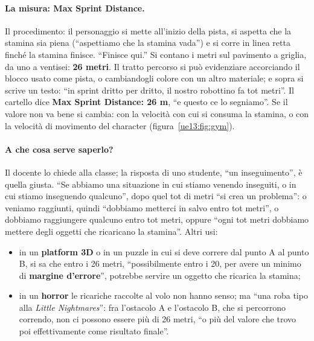 \paragraph{La misura: Max Sprint Distance.} Il procedimento: il personaggio si mette
all'inizio della pista, si aspetta che la stamina sia piena (``aspettiamo che la stamina
vada'') e si corre in linea retta finché la stamina finisce. ``Finisce qui.'' Si contano i
metri sul pavimento a griglia, da uno a ventisei: \textbf{26 metri}. Il tratto percorso
si può evidenziare accorciando il blocco usato come pista, o cambiandogli colore con un
altro materiale; e sopra si scrive un testo: ``in sprint dritto per dritto, il nostro
robottino fa tot metri''. Il cartello dice \textbf{Max Sprint Distance: 26 m}, ``e questo
ce lo segniamo''. Se il valore non va bene si cambia: con la velocità con cui si consuma
la stamina, o con la velocità di movimento del character (figura~\ref{ue13:fig:gym}).

\paragraph{A che cosa serve saperlo?} Il docente lo chiede alla classe; la risposta di uno
studente, ``un inseguimento'', è quella giusta. ``Se abbiamo una situazione in cui stiamo
venendo inseguiti, o in cui stiamo inseguendo qualcuno'', dopo quel tot di metri ``si crea
un problema'': o veniamo raggiunti, quindi ``dobbiamo metterci in salvo entro tot metri'',
o dobbiamo raggiungere qualcuno entro tot metri, oppure ``ogni tot metri dobbiamo mettere
degli oggetti che ricaricano la stamina''. Altri usi:
\begin{itemize}
  \item in un \textbf{platform 3D} o in un puzzle in cui si deve correre dal punto A al
        punto B, si sa che entro i 26 metri, ``possibilmente entro i 20, per avere un
        minimo di \textbf{margine d'errore}'', potrebbe servire un oggetto che ricarica
        la stamina;
  \item in un \textbf{horror} le ricariche raccolte al volo non hanno senso; ma ``una roba
        tipo alla \emph{Little Nightmares}'': fra l'ostacolo A e l'ostacolo B, che si
        percorrono correndo, non ci possono essere più di 26 metri, ``o più del valore che
        trovo poi effettivamente come risultato finale''.
\end{itemize}

